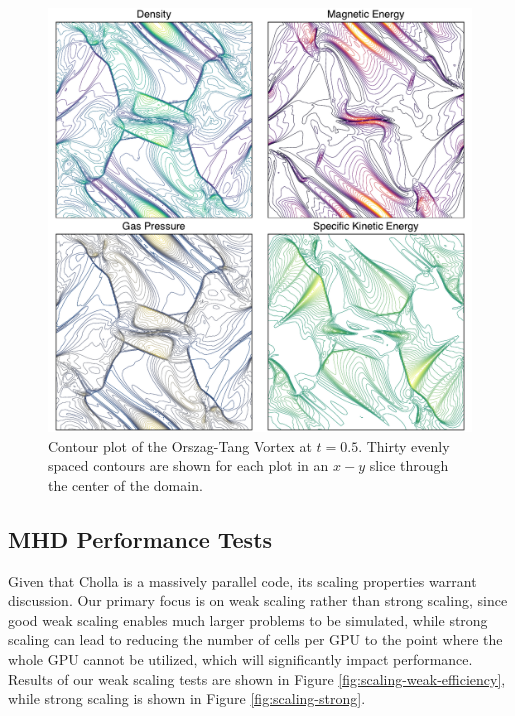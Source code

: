 \documentclass[modern]{aastex631}
\newcommand*{\img}[1]{%
    \raisebox{-.05\baselineskip}{%
        \texttt{[image: \#1]}%
    }%
}
\begin{document}
\begin{figure}[!ht]
    \includegraphics[width=\linewidth]{orszag-tang-vortex.pdf}
    \caption{Contour plot of the Orszag-Tang Vortex at $t=0.5$. Thirty evenly spaced contours are shown for each plot in an $x-y$ slice through the center of the domain.  \href{https://zenodo.org/records/10927223}{\img{zenodo-gradient-200.png}}}
    \label{fig:otv}
\end{figure}

\subsection{MHD Performance Tests}
\label{sec:mhd-perf-tests}

Given that Cholla is a massively parallel code, its scaling properties warrant discussion. Our primary focus is on weak scaling rather than strong scaling, since good weak scaling enables much larger problems to be simulated, while strong scaling can lead to reducing the number of cells per GPU to the point where the whole GPU cannot be utilized, which will significantly impact performance. Results of our weak scaling tests are shown in Figure \ref{fig:scaling-weak-efficiency}, while strong scaling is shown in Figure \ref{fig:scaling-strong}.
\end{document}
